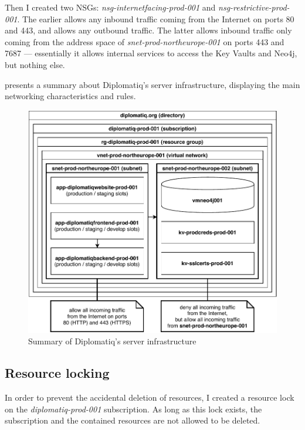 Then I created two NSGs: \emph{nsg-internetfacing-prod-001} and \emph{nsg-restrictive-prod-001}. The earlier allows any inbound traffic coming from the Internet on ports 80 and 443, and allows any outbound traffic. The latter allows inbound traffic only coming from the address space of \emph{snet-prod-northeurope-001} on ports 443 and 7687 — essentially it allows internal services to access the Key Vaults and Neo4j, but nothing else.

 presents a summary about Diplomatiq's server infrastructure, displaying the main networking characteristics and rules.

\begin{figure}[!htb]
    \includegraphics[width=\textwidth]{figures/infrastructure.pdf}
    \caption{Summary of Diplomatiq's server infrastructure}
    \label{fig:infrastructure}
\end{figure}

\subsection{Resource locking}

In order to prevent the accidental deletion of resources, I created a resource lock on the \emph{diplomatiq-prod-001} subscription. As long as this lock exists, the subscription and the contained resources are not allowed to be deleted.
